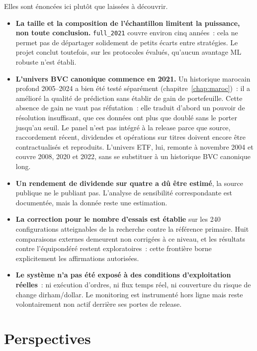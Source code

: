 Elles sont énoncées ici plutôt que laissées à découvrir.

\begin{itemize}
  \item \textbf{La taille et la composition de l'échantillon limitent la
        puissance, non toute conclusion.} \texttt{full\_2021} couvre environ
        cinq années~: cela ne permet pas de départager solidement de petits écarts
        entre stratégies. Le projet conclut toutefois, sur les protocoles
        évalués, qu'aucun avantage ML robuste n'est établi.
  \item \textbf{L'univers BVC canonique commence en 2021.} Un historique marocain
        profond 2005--2024 a bien été testé séparément (chapitre~\ref{chap:maroc})~:
        il a amélioré la qualité de prédiction sans établir de gain de
        portefeuille. Cette absence de gain ne vaut pas réfutation~: elle traduit
        d'abord un pouvoir de résolution insuffisant, que ces données ont plus que
        doublé sans le porter jusqu'au seuil. Le panel n'est pas intégré
        à la release parce que source, raccordement récent, dividendes et
        opérations sur titres doivent encore être contractualisés et reproduits.
        L'univers ETF, lui, remonte à novembre 2004 et couvre 2008, 2020 et 2022,
        sans se substituer à un historique BVC canonique long.
  \item \textbf{Un rendement de dividende sur quatre a dû être estimé}, la source
        publique ne le publiant pas. L'analyse de sensibilité correspondante est
        documentée, mais la donnée reste une estimation.
  \item \textbf{La correction pour le nombre d'essais est établie} sur les 240
        configurations atteignables de la recherche contre la référence primaire.
        Huit comparaisons externes demeurent non corrigées à ce niveau, et les
        résultats contre l'équipondéré restent exploratoires~: cette frontière
        borne explicitement les affirmations autorisées.
  \item \textbf{Le système n'a pas été exposé à des conditions d'exploitation
        réelles}~: ni exécution d'ordres, ni flux temps réel, ni couverture du
        risque de change dirham/dollar. Le monitoring est instrumenté hors ligne
        mais reste volontairement non actif derrière ses portes de release.
\end{itemize}

\section*{Perspectives}

